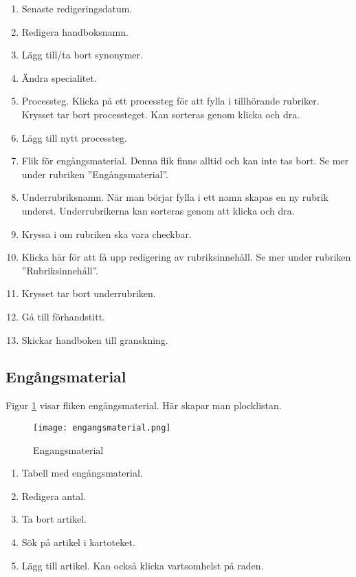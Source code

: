 \documentclass[12pt]{amsart}
\begin{document}
\begin{enumerate}
\item Senaste redigeringsdatum.
\item Redigera handboksnamn.
\item Lägg till/ta bort synonymer.
\item Ändra specialitet.
\item Processteg. Klicka på ett processteg för att fylla i tillhörande rubriker. Krysset tar bort processteget. Kan sorteras genom klicka och dra.
\item Lägg till nytt processteg.
\item Flik för engångsmaterial. Denna flik finns alltid och kan inte tas bort. Se mer under rubriken ''Engångsmaterial''.
\item Underrubriksnamn. När man börjar fylla i ett namn skapas en ny rubrik underst. Underrubrikerna kan sorteras genom att klicka och dra.
\item Kryssa i om rubriken ska vara checkbar.
\item Klicka här för att få upp redigering av rubriksinnehåll. Se mer under rubriken ''Rubriksinnehåll''.
\item Krysset tar bort underrubriken.
\item Gå till förhandstitt.
\item Skickar handboken till granskning.
\end{enumerate}

\subsection{Engångsmaterial}
Figur \ref{fig:engangsmaterial} visar fliken engångsmaterial. Här skapar man plocklistan.

\begin{figure}[H]
	\begin{center}
	\texttt{[image: engangsmaterial.png]}
	\caption{Engangsmaterial}
	\label{fig:engangsmaterial}
	\end{center}
\end{figure}

\begin{enumerate}
\item Tabell med engångsmaterial.
\item Redigera antal.
\item Ta bort artikel.
\item Sök på artikel i kartoteket.
\item Lägg till artikel. Kan också klicka vartsomhelst på raden.

\end{enumerate}
\end{document}
